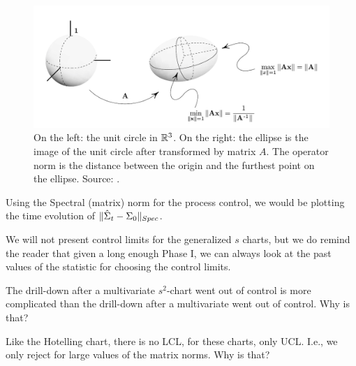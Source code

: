 \begin{figure}
\centering
\includegraphics[width=0.7\linewidth]{art/operator_norm}
\caption[Geometry of Spectral Matrix Norms]{
\footnotesize
On the left: the unit circle in $\mathbb{R}^3$. 
On the right: the ellipse is the image of the unit circle after transformed by matrix $A$. The operator norm is the distance between the origin and the furthest point on the ellipse. 
\newline Source: \cite{meyer_matrix_2001}.}
\label{fig:operator_norm}
\end{figure}

Using the Spectral (matrix) norm for the process control, we would be plotting the time evolution of $\Vert \hat{\Sigma}_t-\Sigma_0 \Vert_{Spec}$.


 
We will not present control limits for the generalized $s$ charts, but we do remind the reader that given a long enough Phase I, we can always look at the past values of the statistic for choosing the control limits. 


\begin{think}
	The drill-down after a multivariate $s^2$-chart went out of control is more complicated than the drill-down after a multivariate \barxChart went out of control. 
	Why is that?
\end{think}


\begin{think}
	Like the Hotelling chart, there is no LCL, for these charts, only UCL. 
	I.e., we only reject for large values of the matrix norms. 
	Why is that?
\end{think}

